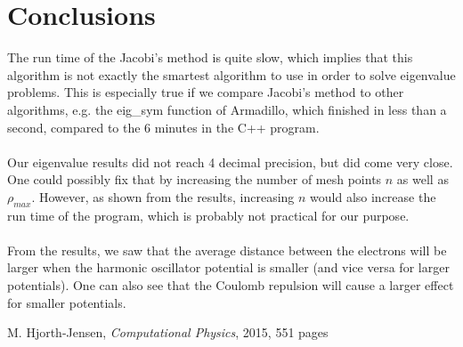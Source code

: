 \documentclass{article}
\begin{document}
\section{Conclusions} \label{section:conc}
The run time of the Jacobi's method is quite slow, which implies that this algorithm is not exactly the smartest algorithm to use in order to solve eigenvalue problems. This is especially true if we compare Jacobi's method to other algorithms, e.g. the eig\_sym function of Armadillo, which finished in less than a second, compared to the 6 minutes in the C++ program.\\\\
Our eigenvalue results did not reach 4 decimal precision, but did come very close. One could possibly fix that by increasing the number of mesh points $n$ as well as $\rho_{max}$. However, as shown from the results, increasing $n$ would also increase the run time of the program, which is probably not practical for our purpose.\\\\
From the results, we saw that the average distance between the electrons will be larger when the harmonic oscillator potential is smaller (and vice versa for larger potentials). One can also see that the Coulomb repulsion will cause a larger effect for smaller potentials. 

\begin{thebibliography}{1}
	 M. Hjorth-Jensen, \emph{Computational Physics}, 2015, 551 pages
\end{thebibliography}
\end{document}

